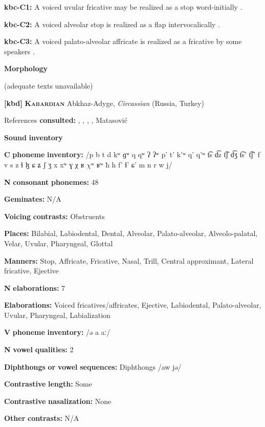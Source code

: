 \textbf{kbc-C1:} A voiced uvular fricative may be realized as a stop word-initially \citep[16]{Sandalo1997}.

\textbf{kbc-C2:} A voiced alveolar stop is realized as a flap intervocalically \citep[16]{Sandalo1997}.

\textbf{kbc-C3:} A voiced palato-alveolar affricate is realized as a fricative by some speakers \citep[15-16]{Sandalo1997}.

\textbf{Morphology}

(adequate texts unavailable)

\textbf{[kbd]}   \textbf{\textsc{Kabardian}}  Abkhaz-Adyge, \textit{Circassian} (Russia, Turkey)

References \textbf{consulted:} \citet{Applebaum2013}, \citet{Colarusso2006}, \citet{GordonApplebaum2010}, \citet{Kuipers1960}, Matasović 

\textbf{Sound} \textbf{inventory}

\textbf{C} \textbf{phoneme} \textbf{inventory:} /p b t d kʷ ɡʷ q qʷ ʔ ʔʷ p’ t’ k’ʷ q’ q’ʷ t͡s d͡z t͡ʃ d͡ʒ t͡s’ t͡ʃ’ f v s z ɬ ɮ ɕ ʑ ʃ ʒ x xʷ ɣ χ ʁ $\chi ʷ$ ʁʷ ħ h f' ɬ’ ɕ' m n r w j/

\textbf{N} \textbf{consonant} \textbf{phonemes:} 48

\textbf{Geminates:} N/A

\textbf{Voicing} \textbf{contrasts:} Obstruents

\textbf{Places:} Bilabial, Labiodental, Dental, Alveolar, Palato-alveolar, Alveolo-palatal, Velar, Uvular, Pharyngeal, Glottal

\textbf{Manners:} Stop, Affricate, Fricative, Nasal, Trill, Central approximant, Lateral fricative, Ejective

\textbf{N} \textbf{elaborations:} 7

\textbf{Elaborations:} Voiced fricatives/affricates, Ejective, Labiodental, Palato-alveolar, Uvular, Pharyngeal, Labialization

\textbf{V} \textbf{phoneme} \textbf{inventory:} /ə a aː/

\textbf{N} \textbf{vowel} \textbf{qualities:} 2

\textbf{Diphthongs} \textbf{or} \textbf{vowel} \textbf{sequences:} Diphthongs /aw jə/

\textbf{Contrastive} \textbf{length:} Some

\textbf{Contrastive} \textbf{nasalization:} None

\textbf{Other} \textbf{contrasts:} N/A

